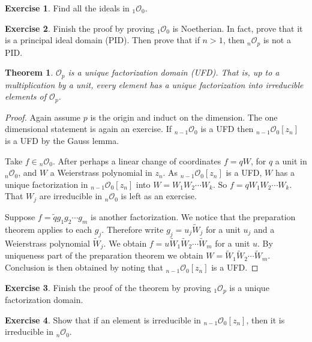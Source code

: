 \documentclass[12pt,openany]{book}
\newcommand{\sO}{{\mathcal{O}}}
\theoremstyle{plain}
\newtheorem{thm}{Theorem}[section]
\theoremstyle{remark}
\theoremstyle{definition}
\newenvironment{exbox}{%
    \def\FrameCommand{\vrule width 1pt \relax\hspace {10pt}}%
    \MakeFramed {\advance \hsize -\width \FrameRestore }%
}{%
    \endMakeFramed
}
\theoremstyle{exercise}
\newtheorem{exercise}{Exercise}[section]
\theoremstyle{example}
\begin{document}
\begin{exbox}
\begin{exercise}
Find all the ideals in ${}_1\sO_0$.
\end{exercise}

\begin{exercise}
Finish the proof by proving
${}_1\sO_0$ is Noetherian.  In fact, prove that it is a principal ideal domain
(PID).  Then prove that if $n > 1$, then ${}_n\sO_p$ is not a PID.
\end{exercise}
\end{exbox}

\begin{thm}
$\sO_p$ is a unique factorization domain (UFD).  That is, up to a
multiplication by a unit, every element has a unique factorization into
irreducible elements of $\sO_p$.
\end{thm}

\begin{proof}
Again assume $p$ is the origin and induct on the dimension.
The one dimensional statement is again
an exercise.  If ${}_{n-1}\sO_0$ is a UFD then
${}_{n-1}\sO_0[z_n]$ is a UFD by the Gauss lemma.

Take $f \in {}_n\sO_0$.  After perhaps a linear change of coordinates
$f = qW$, for $q$ a unit in ${}_n\sO_0$,
and $W$ a Weierstrass polynomial in $z_n$.
As 
${}_{n-1}\sO_0[z_n]$ is a UFD, $W$ has a unique
factorization in 
${}_{n-1}\sO_0[z_n]$ into $W = W_1 W_2 \cdots W_k$.
So $f = q W_1 W_2 \cdots W_k$.  That $W_j$ are irreducible
in ${}_n\sO_0$ is left as an exercise.

Suppose 
$f = \tilde{q} g_1 g_2 \cdots g_m$ is another factorization.  We notice that
the preparation theorem applies to each $g_j$.  Therefore write
$g_j = u_j \widetilde{W}_j$ for a unit $u_j$ and a Weierstrass polynomial
$\widetilde{W}_j$.  We obtain
$f = u \widetilde{W}_1 \widetilde{W}_2 \cdots \widetilde{W}_m$ for a unit $u$.  By
uniqueness part of the preparation theorem we obtain
$W = \widetilde{W}_1 \widetilde{W}_2 \cdots \widetilde{W}_m$.  Conclusion is then
obtained by noting that
${}_{n-1}\sO_0[z_n]$ is a UFD.
\end{proof}

\begin{exbox}
\begin{exercise}
Finish the proof of the theorem by proving 
${}_1\sO_p$ is a unique factorization domain.
\end{exercise}

\begin{exercise}
Show that if an element is irreducible in 
${}_{n-1}\sO_0[z_n]$, then it is irreducible in
${}_{n}\sO_0$.
\end{exercise}
\end{exbox}
\end{document}
